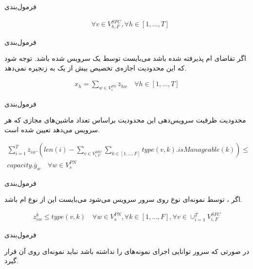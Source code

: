 \documentclass{beamer}
\begin{document}
\begin{persian}
\begin{frame}{فرمول‌بندی}
\begin{latin}
\begin{align}
        \quad
        \forall v \in V_{h,F}^{SFC}, \forall h \in [1,\ldots, T]
    \end{align}\end{latin}
\end{frame}
\begin{frame}{فرمول‌بندی}
    \par
    اگر تقاضای ام پذیرفته شده باشد
    می‌بایست توسط یک  سرویس شده باشد.
    توجه شود که این محدودیت اجازه‌ی تخصیص بیش از یک 
    به زنجیره نمی‌دهد.
    \begin{latin}\begin{align}
        x_h = \sum_{w \in V_{s}^{PN}} \bar{z}_{hw}
        \quad
        \forall h \in [1,\ldots, T]
    \end{align}\end{latin}
\end{frame}
\begin{frame}{فرمول‌بندی}
    \par
    محدودیت ظرفیت سرویس‌دهی 
    این محدودیت براساس تعداد ماشین‌های مجازی که هر
    سرویس می‌دهد تعیین شده است.

    \begin{latin}
        \begin{align}
            \sum_{i=1}^{T} \bar{z}_{iw} . (len(i) - \sum_{v \in V_{i, F}^{SFC}} \sum_{k \in [1, \dots, F]} type(v, k) . isManageable(k)) \le \nonumber \\
            capacity . \bar{y}_{w}
            \quad
            \forall w \in V_{s}^{PN}
        \end{align}
    \end{latin}
\end{frame}
\begin{frame}{فرمول‌بندی}
    \par
    اگر ، 
    توسط نمونه‌ای نوع 
    روی سرور  سرویس می‌شود می‌بایست
    این  از نوع ام باشد.
    \begin{latin}\begin{align}
        z_{vw}^{k} \le type(v, k)
        \quad
        \forall w \in V_{s}^{PN},
        \forall k \in [1,\ldots, F],
        \forall v \in \cup_{i=1}^T V_{i, F}^{SFC}
    \end{align}\end{latin}
\end{frame}
\begin{frame}{فرمول‌بندی}
    \par
    در صورتی که سرور 
    توانایی اجرای نمونه‌های 
    را نداشته باشد نباید نمونه‌ای روی آن قرار گیرد.


\end{frame}
\end{persian}
\end{document}
